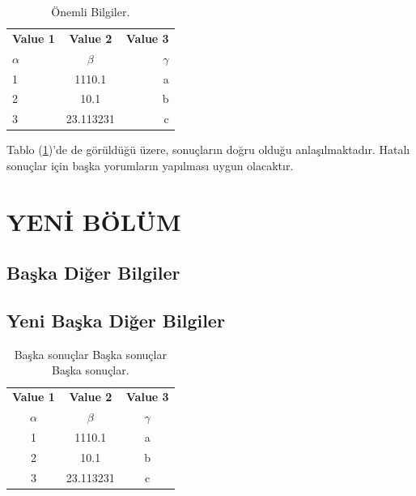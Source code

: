 \documentclass[turkish]{eqengconf}
\begin{document}
\begin{table}[]
	\setlength\abovecaptionskip{-5pt}
	\setlength\belowcaptionskip{5pt}
	\centering
		\caption{\label{tab:onemlibilgi}Önemli Bilgiler.}
		\begin{tabular}{l|c|r} %
			\textbf{Value 1} & \textbf{Value 2} & \textbf{Value 3}\\
			$\alpha$ & $\beta$ & $\gamma$ \\
			\hline
			1 & 1110.1 & a\\
			2 & 10.1 & b\\
			3 & 23.113231 & c\\
		\end{tabular}
	 \vspace{-5pt}
\end{table}

Tablo (\ref{tab:onemlibilgi})'de de görüldüğü üzere, sonuçların doğru olduğu anlaşılmaktadır. Hatalı sonuçlar için başka yorumların yapılması uygun olacaktır.

\blindtext

\blindtext

\section{YENİ BÖLÜM}
\blindtext

\blindtext

\subsection{Başka Diğer Bilgiler}

\blindtext

\subsection{Yeni Başka Diğer Bilgiler}

\blindtext

\begin{table}
	\setlength\abovecaptionskip{10pt}
	\setlength\belowcaptionskip{5pt}
	\vspace{-10pt}
	\centering
	\caption{\label{tab:baskasonuc}Başka sonuçlar Başka sonuçlar Başka sonuçlar.}
	\begin{tabular}{c|c|c} %
		\textbf{Value 1} & \textbf{Value 2} & \textbf{Value 3}\\
		$\alpha$ & $\beta$ & $\gamma$ \\
		\hline
		1 & 1110.1 & a\\
		2 & 10.1 & b\\
		3 & 23.113231 & c\\
	\end{tabular}
    \vspace{-10pt}
\end{table}
\end{document}
